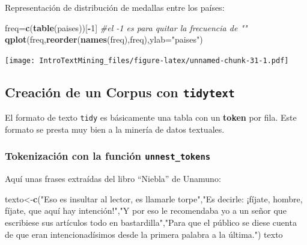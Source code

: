 \documentclass[]{article}
\newenvironment{Shaded}{\begin{snugshade}}{\end{snugshade}}
\newcommand{\KeywordTok}[1]{\textcolor[rgb]{0.13,0.29,0.53}{\textbf{#1}}}
\newcommand{\DataTypeTok}[1]{\textcolor[rgb]{0.13,0.29,0.53}{#1}}
\newcommand{\DecValTok}[1]{\textcolor[rgb]{0.00,0.00,0.81}{#1}}
\newcommand{\StringTok}[1]{\textcolor[rgb]{0.31,0.60,0.02}{#1}}
\newcommand{\CommentTok}[1]{\textcolor[rgb]{0.56,0.35,0.01}{\textit{#1}}}
\newcommand{\OperatorTok}[1]{\textcolor[rgb]{0.81,0.36,0.00}{\textbf{#1}}}
\newcommand{\NormalTok}[1]{#1}
\begin{document}
Representación de distribución de medallas entre los países:

\begin{Shaded}
\begin{Highlighting}[]
\NormalTok{freq=}\KeywordTok{c}\NormalTok{(}\KeywordTok{table}\NormalTok{(paises))[}\OperatorTok{-}\DecValTok{1}\NormalTok{] }\CommentTok{#el -1 es para quitar la frecuencia de ""}
\KeywordTok{qplot}\NormalTok{(freq,}\KeywordTok{reorder}\NormalTok{(}\KeywordTok{names}\NormalTok{(freq),freq),}\DataTypeTok{ylab=}\StringTok{"paises"}\NormalTok{)}
\end{Highlighting}
\end{Shaded}

\texttt{[image: IntroTextMining\_files/figure-latex/unnamed-chunk-31-1.pdf]}

\subsection{\texorpdfstring{Creación de un Corpus con
\texttt{tidytext}}{Creación de un Corpus con tidytext}}\label{creacion-de-un-corpus-con-tidytext}

El formato de texto \texttt{tidy} es básicamente una tabla con un
\textbf{token} por fila. Este formato se presta muy bien a la minería de
datos textuales.

\subsubsection{\texorpdfstring{Tokenización con la función
\texttt{unnest\_tokens}}{Tokenización con la función unnest\_tokens}}\label{tokenizacion-con-la-funcion-unnest_tokens}

Aquí unas frases extraídas del libro ``Niebla'' de Unamuno:

\begin{Shaded}
\begin{Highlighting}[]
\NormalTok{texto<-}\KeywordTok{c}\NormalTok{(}\StringTok{"Eso es insultar al lector, es llamarle torpe"}\NormalTok{,}\StringTok{"Es decirle: ¡fíjate, hombre, fíjate, que aquí hay intención!"}\NormalTok{,}\StringTok{"Y por eso le recomendaba yo a un señor que escribiese sus artículos todo en bastardilla"}\NormalTok{,}\StringTok{"Para que el público se diese cuenta de que eran intencionadísimos desde la primera palabra a la última."}\NormalTok{)}
\NormalTok{texto}
\end{Highlighting}
\end{Shaded}
\end{document}
